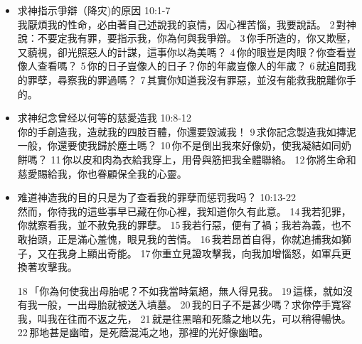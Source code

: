 \begin{itemize}
\begin{itemize}
\item 求神指示爭辯（降灾)的原因 10:1-7\\
我厭煩我的性命，必由著自己述說我的哀情，因心裡苦惱，我要說話。 2 對神說：不要定我有罪，要指示我，你為何與我爭辯。 3 你手所造的，你又欺壓，又藐視，卻光照惡人的計謀，這事你以為美嗎？ 4 你的眼豈是肉眼？你查看豈像人查看嗎？ 5 你的日子豈像人的日子？你的年歲豈像人的年歲？ 6 就追問我的罪孽，尋察我的罪過嗎？ 7 其實你知道我沒有罪惡，並沒有能救我脫離你手的。
\item 求神纪念曾经以何等的慈愛造我 10:8-12\\
你的手創造我，造就我的四肢百體，你還要毀滅我！ 9 求你記念製造我如摶泥一般，你還要使我歸於塵土嗎？ 10 你不是倒出我來好像奶，使我凝結如同奶餅嗎？ 11 你以皮和肉為衣給我穿上，用骨與筋把我全體聯絡。 12 你將生命和慈愛賜給我，你也眷顧保全我的心靈。
\item 难道神造我的目的只是为了查看我的罪孽而惩罚我吗？ 10:13-22\\
然而，你待我的這些事早已藏在你心裡，我知道你久有此意。 14 我若犯罪，你就察看我，並不赦免我的罪孽。 15 我若行惡，便有了禍；我若為義，也不敢抬頭，正是滿心羞愧，眼見我的苦情。 16 我若昂首自得，你就追捕我如獅子，又在我身上顯出奇能。 17 你重立見證攻擊我，向我加增惱怒，如軍兵更換著攻擊我。

18 「你為何使我出母胎呢？不如我當時氣絕，無人得見我。 19 這樣，就如沒有我一般，一出母胎就被送入墳墓。 20 我的日子不是甚少嗎？求你停手寬容我，叫我在往而不返之先， 21 就是往黑暗和死蔭之地以先，可以稍得暢快。 22 那地甚是幽暗，是死蔭混沌之地，那裡的光好像幽暗。
\end{itemize}
\end{itemize}

